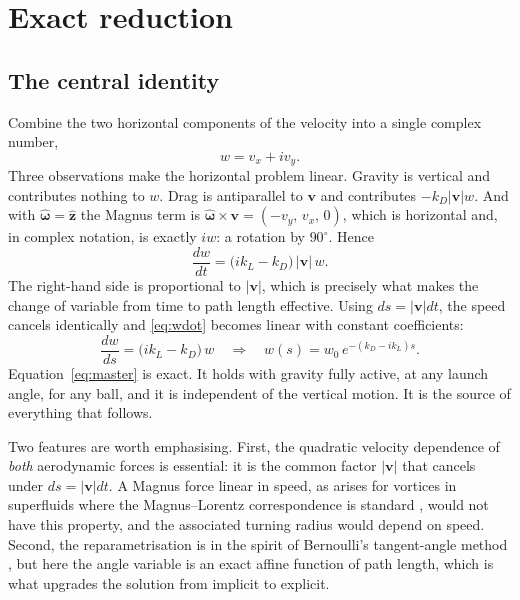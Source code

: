 \documentclass[aip,amsmath,amssymb,preprint,floatfix]{revtex4-2}
\newcommand{\kL}{k_{L}}
\newcommand{\kD}{k_{D}}
\newcommand{\vv}{\bm{v}}
\newcommand{\zhat}{\hat{\bm{z}}}
\newcommand{\omhat}{\hat{\bm{\omega}}}
\begin{document}
\section{Exact reduction}
\label{sec:reduction}

\subsection{The central identity}

Combine the two horizontal components of the velocity into a single complex number,
\begin{equation}
w = v_x + i v_y .
\end{equation}
Three observations make the horizontal problem linear. Gravity is vertical and
contributes nothing to $w$. Drag is antiparallel to $\vv$ and contributes
$-\kD|\vv|w$. And with $\omhat=\zhat$ the Magnus term is
$\omhat\times\vv=(-v_y,\,v_x,\,0)$, which is horizontal and, in complex notation,
is exactly $iw$: a rotation by $90^\circ$. Hence
\begin{equation}
\frac{dw}{dt} = \bigl(i\kL-\kD\bigr)\,|\vv|\,w .
\label{eq:wdot}
\end{equation}
The right-hand side is proportional to $|\vv|$, which is precisely what makes the
change of variable from time to path length effective. Using $ds=|\vv|dt$, the
speed cancels identically and \eqref{eq:wdot} becomes linear with constant
coefficients:
\begin{equation}
\boxed{\;\frac{dw}{ds} = \bigl(i\kL-\kD\bigr)\,w
\quad\Longrightarrow\quad
w(s) = w_0\,e^{-(\kD-i\kL)s}.\;}
\label{eq:master}
\end{equation}
Equation~\eqref{eq:master} is exact. It holds with gravity fully active, at any
launch angle, for any ball, and it is independent of the vertical motion. It is the
source of everything that follows.

Two features are worth emphasising. First, the quadratic velocity dependence of
\emph{both} aerodynamic forces is essential: it is the common factor $|\vv|$ that
cancels under $ds=|\vv|dt$. A Magnus force linear in speed, as arises for vortices
in superfluids where the Magnus--Lorentz correspondence is standard
\cite{Sonin1997}, would not have this property, and the associated turning radius
would depend on speed. Second, the reparametrisation is in the spirit of
Bernoulli's tangent-angle method \cite{Lubarda2022}, but here the angle variable is
an exact affine function of path length, which is what upgrades the solution from
implicit to explicit.
\end{document}

